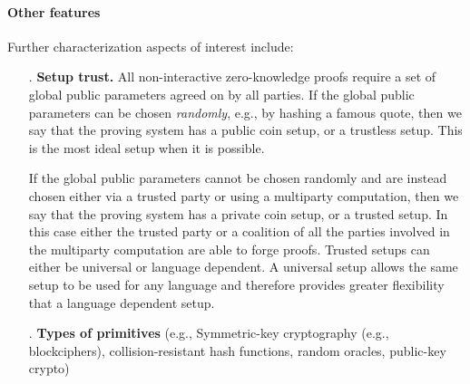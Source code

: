 \paragraph{Other features}
Further characterization aspects of interest include:
\begin{enumerate}
    \item[\newfeat.\label{feat:plain}] \textbf{Setup trust.}
    All non-interactive zero-knowledge proofs require a set of global public parameters agreed on by all parties.
    If the global public parameters can be chosen \textit{randomly}, e.g., by hashing a famous quote,
    then we say that the proving system has a public coin setup,
    or a trustless setup.  This is the most ideal setup when it is possible. 
    
    If the global public parameters cannot be chosen randomly and are instead chosen either via a trusted party or using a multiparty computation,
    then we say that the proving system has a private coin setup, or a trusted setup.
    In this case either the trusted party or a coalition of all the parties involved in the multiparty computation are able to forge proofs.
    Trusted setups can either be universal or language dependent.
    A universal setup allows the same setup to be used for any language and therefore provides greater flexibility that a language dependent setup.
    \loosen
    
    \item[\newfeat.\label{feat:symm-key}] \textbf{Types of primitives} (e.g.,
    Symmetric-key cryptography (e.g., blockciphers), collision-re\-sist\-ant hash functions, random oracles, public-key crypto)

\end{enumerate}
